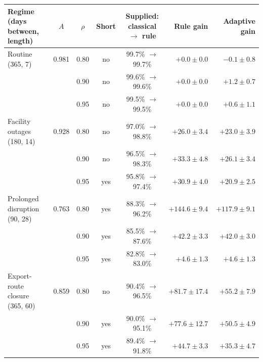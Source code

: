 \begin{tabular}{@{}lccccrr@{}}
\toprule
Regime (days between, length) & $A$ & $\rho$ & Short & Supplied: classical $\to$ rule & Rule gain & Adaptive gain \\
\midrule
Routine (365, 7) & 0.981 & 0.80 & no & 99.7\% $\to$ 99.7\% & $+0.0\pm0.0$ & $-0.1\pm0.8$ \\
 &  & 0.90 & no & 99.6\% $\to$ 99.6\% & $+0.0\pm0.0$ & $+1.2\pm0.7$ \\
 &  & 0.95 & no & 99.5\% $\to$ 99.5\% & $+0.0\pm0.0$ & $+0.6\pm1.1$ \\
\addlinespace
Facility outages (180, 14) & 0.928 & 0.80 & no & 97.0\% $\to$ 98.8\% & $+26.0\pm3.4$ & $+23.0\pm3.9$ \\
 &  & 0.90 & no & 96.5\% $\to$ 98.3\% & $+33.3\pm4.8$ & $+26.1\pm3.4$ \\
 &  & 0.95 & yes & 95.8\% $\to$ 97.4\% & $+30.9\pm4.0$ & $+20.9\pm2.5$ \\
\addlinespace
Prolonged disruption (90, 28) & 0.763 & 0.80 & yes & 88.3\% $\to$ 96.2\% & $+144.6\pm9.4$ & $+117.9\pm9.1$ \\
 &  & 0.90 & yes & 85.5\% $\to$ 87.6\% & $+42.2\pm3.3$ & $+42.0\pm3.0$ \\
 &  & 0.95 & yes & 82.8\% $\to$ 83.0\% & $+4.6\pm1.3$ & $+4.6\pm1.3$ \\
\addlinespace
Export-route closure (365, 60) & 0.859 & 0.80 & no & 90.4\% $\to$ 96.5\% & $+81.7\pm17.4$ & $+55.2\pm7.9$ \\
 &  & 0.90 & yes & 90.0\% $\to$ 95.1\% & $+77.6\pm12.7$ & $+50.5\pm4.9$ \\
 &  & 0.95 & yes & 89.4\% $\to$ 91.8\% & $+44.7\pm3.3$ & $+35.3\pm4.7$ \\
\bottomrule
\end{tabular}
